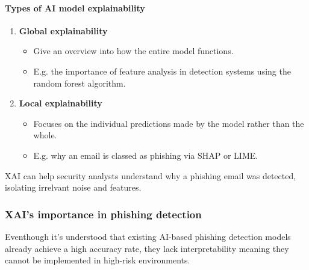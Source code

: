 \paragraph{Types of AI model explainability}
\begin{enumerate}
    \item \textbf{Global explainability}
    \begin{itemize}
        \item Give an overview into how the entire model functions.
        \item E.g. the importance of feature analysis in detection systems using the random forest algorithm.
    \end{itemize}
    \item \textbf{Local explainability}
    \begin{itemize}
        \item Focuses on the individual predictions made by the model rather than the whole.
        \item E.g. why an email is classed as phishing via SHAP or LIME.
    \end{itemize}
\end{enumerate}

\noindent XAI can help security analysts understand why a phishing email was detected, isolating irrelvant noise and features.

\subsubsection*{XAI's importance in phishing detection}
Eventhough it's understood that existing AI-based phishing detection models already achieve a high accuracy rate, they lack interpretability meaning they cannot be implemented in high-risk environments.

